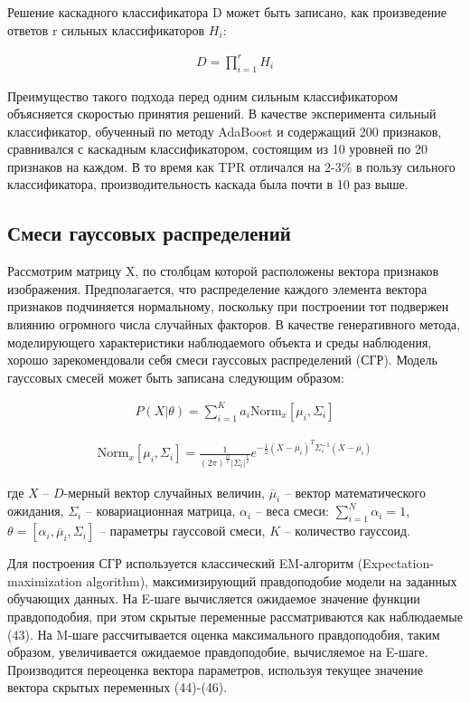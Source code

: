 Решение каскадного классификатора D может быть записано, как произведение ответов r сильных классификаторов $H_i$:

\begin{gather}
D = \prod\limits_{i=1}^{r} H_i
\end{gather}

Преимущество такого подхода перед одним сильным классификатором объясняется скоростью принятия решений. В качестве эксперимента сильный классификатор, обученный по методу AdaBoost и содержащий 200 признаков, сравнивался с каскадным классификатором, состоящим из 10 уровней по 20 признаков на каждом. В то время как TPR отличался на 2-3\% в пользу сильного классификатора, производительность каскада была почти в 10 раз выше.

\subsection{Смеси гауссовых распределений}

Рассмотрим матрицу X, по столбцам которой расположены вектора признаков изображения. Предполагается, что распределение каждого элемента вектора признаков подчиняется нормальному, поскольку при построении тот подвержен влиянию огромного числа случайных факторов. В качестве генеративного метода, моделирующего характеристики наблюдаемого объекта и среды наблюдения, хорошо зарекомендовали себя смеси гауссовых распределений (СГР). Модель гауссовых смесей может быть записана следующим образом:

\begin{gather}
P(X|\theta) = \sum\limits_{i=1}^{K} a_i \text{Norm}_x[\mu_i,\Sigma_i]
\end{gather}

\begin{gather}
\text{Norm}_x[\mu_i,\Sigma_i]=\frac{1}{(2\pi)^\frac{D}{2} |\Sigma_i|^\frac{1}{2}}e^{-\frac{1}{2}(X-\overline{\mu}_i)^T \Sigma_i^{-1}(X-\overline{\mu}_i)}
\end{gather}

где $X$ -- $D$-мерный вектор случайных величин, $\overline{\mu}_i$ -- вектор математического ожидания, $\Sigma_i$ -- ковариационная матрица, $\alpha_i$ -- веса смеси: $\sum_{i=1}^{N} \alpha_i = 1$, $\theta = [\alpha_i, \overline{\mu}_i, \Sigma_i]$ -- параметры гауссовой смеси, $K$ -- количество гауссоид.

Для построения СГР используется классический EM-алгоритм (Expectation-maximization algorithm), максимизирующий правдоподобие модели на заданных обучающих данных. На E-шаге вычисляется ожидаемое значение функции правдоподобия, при этом скрытые переменные рассматриваются как наблюдаемые (43). На M-шаге рассчитывается оценка максимального правдоподобия, таким образом, увеличивается ожидаемое правдоподобие, вычисляемое на E-шаге. Производится переоценка вектора параметров, используя текущее значение вектора скрытых переменных (44)-(46).

